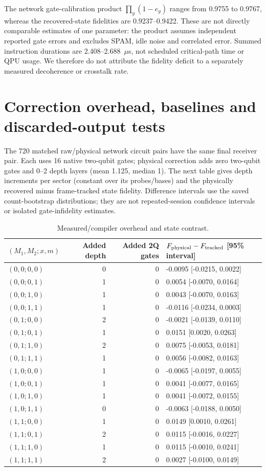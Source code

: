 \documentclass[10pt,a4paper]{article}
\begin{document}
The network gate-calibration product $\prod_g(1-e_g)$ ranges from 0.9755 to 0.9767, whereas the recovered-state fidelities are 0.9237--0.9422. These are not directly comparable estimates of one parameter: the product assumes independent reported gate errors and excludes SPAM, idle noise and correlated error. Summed instruction durations are 2.408--2.688~$\mu$s, not scheduled critical-path time or QPU usage. We therefore do not attribute the fidelity deficit to a separately measured decoherence or crosstalk rate.

\section{Correction overhead, baselines and discarded-output tests}
The 720 matched raw/physical network circuit pairs have the same final receiver pair. Each uses 16 native two-qubit gates; physical correction adds zero two-qubit gates and 0--2 depth layers (mean 1.125, median 1). The next table gives depth increments per sector (constant over its probes/bases) and the physically recovered minus frame-tracked state fidelity. Difference intervals use the saved count-bootstrap distributions; they are not repeated-session confidence intervals or isolated gate-infidelity estimates.
\par\begin{table}[htbp]\centering\small
\caption{Measured/compiler overhead and state contrast.}\label{stab:overhead}
\begin{tabular}{lrrl}\toprule
$(M_1,M_2;x,m)$ & Added depth & Added 2Q gates & $F_{\rm physical}-F_{\rm tracked}$ [95\% interval]\\\midrule
$(0,0;0,0)$ & 0 & 0 & -0.0095 [-0.0215, 0.0022] \\
$(0,0;0,1)$ & 1 & 0 & 0.0054 [-0.0070, 0.0164] \\
$(0,0;1,0)$ & 1 & 0 & 0.0043 [-0.0070, 0.0163] \\
$(0,0;1,1)$ & 1 & 0 & -0.0116 [-0.0234, 0.0003] \\
$(0,1;0,0)$ & 2 & 0 & -0.0021 [-0.0139, 0.0110] \\
$(0,1;0,1)$ & 1 & 0 & 0.0151 [0.0020, 0.0263] \\
$(0,1;1,0)$ & 2 & 0 & 0.0075 [-0.0053, 0.0181] \\
$(0,1;1,1)$ & 1 & 0 & 0.0056 [-0.0082, 0.0163] \\
$(1,0;0,0)$ & 1 & 0 & -0.0065 [-0.0197, 0.0055] \\
$(1,0;0,1)$ & 1 & 0 & 0.0041 [-0.0077, 0.0165] \\
$(1,0;1,0)$ & 1 & 0 & 0.0041 [-0.0072, 0.0155] \\
$(1,0;1,1)$ & 0 & 0 & -0.0063 [-0.0188, 0.0050] \\
$(1,1;0,0)$ & 1 & 0 & 0.0149 [0.0010, 0.0261] \\
$(1,1;0,1)$ & 2 & 0 & 0.0115 [-0.0016, 0.0227] \\
$(1,1;1,0)$ & 1 & 0 & 0.0115 [-0.0010, 0.0241] \\
$(1,1;1,1)$ & 2 & 0 & 0.0027 [-0.0100, 0.0149] \\
\bottomrule\end{tabular}\end{table}\par
\end{document}
